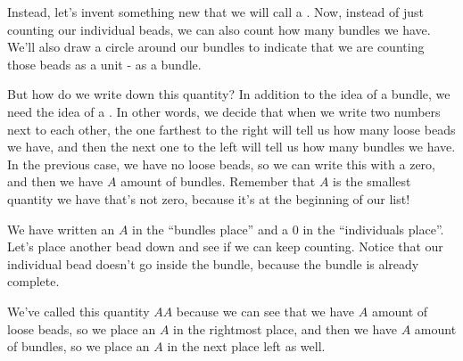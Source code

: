 \documentclass{ximera}
\begin{document}
Instead, let's invent something new that we will call a . Now, instead of just counting our individual beads, we can also count how many bundles we have. We'll also draw a circle around our bundles to indicate that we are counting those beads as a unit - as a bundle.

\begin{center}
\end{center}

But how do we write down this quantity? In addition to the idea of a bundle, we need the idea of a . In other words, we decide that when we write two numbers next to each other, the one farthest to the right will tell us how many loose beads we have, and then the next one to the left will tell us how many bundles we have. In the previous case, we have no loose beads, so we can write this with a zero, and then we have $A$ amount of bundles. Remember that $A$ is the smallest quantity we have that's not zero, because it's at the beginning of our list!

\begin{center}
\end{center}

We have written an $A$ in the ``bundles place'' and a $0$ in the ``individuals place''. Let's place another bead down and see if we can keep counting. Notice that our individual bead doesn't go inside the bundle, because the bundle is already complete.

\begin{center}
\end{center}

We've called this quantity $AA$ because we can see that we have $A$ amount of loose beads, so we place an $A$ in the rightmost place, and then we have $A$ amount of bundles, so we place an $A$ in the next place left as well.
\end{document}
